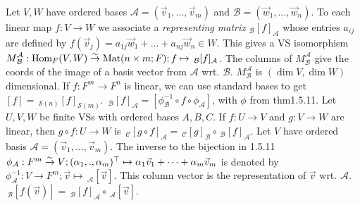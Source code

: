  Let $V,W$ have ordered bases $\mathcal{A} = (\vec{v}_{1}, \dots, \vec{v}_{m})$ and $\mathcal{B} = (\vec{w}_{1}, \dots, \vec{w}_{n})$. To each linear map $f : V \to W$ we associate a \emph{representing matrix} $_{\mathcal{B}}[f]_{\mathcal{A}}$ whose entries $a_{ij}$ are defined by $f(\vec{v}_{j}) = a_{1j}\vec{w}_{1} + \dots + a_{nj}\vec{w}_{n} \in W$. This gives a VS isomorphism ${\textstyle M}^{\mathcal{A}}_{\mathcal{B}} : \text{Hom}_{F}(V, W) \stackrel{\sim}{\to} \text{Mat}(n \times m; F); f \mapsto \,_{\mathcal{B}}[f]_{\mathcal{A}}$.
The columns of ${\textstyle M}^{\mathcal{A}}_{\mathcal{B}}$ give the coords of the image of a basis vector from $\mathcal{A}$ wrt. $\mathcal{B}$. ${\textstyle M}^{\mathcal{A}}_{\mathcal{B}}$ is $(\dim V, \dim W)$ dimensional.
If $f : F^{m} \to F^{n}$ is linear, we can use standard bases to get $[f] = \,_{\mathcal{S}(n)}[f]_{\mathcal{S}(m)}$. $\,_{\mathcal{B}}[f]_{\mathcal{A}} = [\phi_{\mathcal{B}}^{-1} \circ f \circ \phi_{\mathcal{A}}]$, with $\phi$ from thm1.5.11.
 Let $U, V, W$ be finite VSs with ordered bases $A, B, C$. If $f : U \to V$ and $g : V \to W$ are linear, then $g \circ f : U \to W$ is $\,_{\mathcal{C}}[g \circ f]_{\mathcal{A}} = \,_{\mathcal{C}}[g]_{\mathcal{B}} \circ \,_{\mathcal{B}}[f]_{\mathcal{A}}$.
 Let $V$ have ordered basis $\mathcal{A} = (\vec{v}_{1}, \dots, \vec{v}_{m})$. The inverse to the bijection in 1.5.11 $\phi_{\mathcal{A}} : F^{m} \stackrel{\sim}{\to} V; (\alpha_{1}, ., \alpha_{m})^{\top} \mapsto \alpha_{1}\vec{v}_{1} + \dots + \alpha_{m}\vec{v}_{m}$ is denoted by $\phi_{\mathcal{A}}^{-1} : V \to F^{m}; \vec{v} \mapsto \,_{\mathcal{A}}[\vec{v}]$. This column vector is the representation of $\vec{v}$ wrt. $\mathcal{A}$.
 $\,_{\mathcal{B}}[f(\vec{v})] = \,_{\mathcal{B}}[f]_{\mathcal{A}} \circ \,_{\mathcal{A}}[\vec{v}]$.
